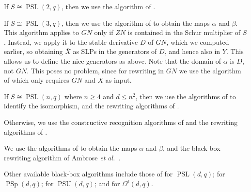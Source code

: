 \documentclass[12pt,twoside,reqno,psamsfonts]{amsproc}
\numberwithin{equation}{section}
\numberwithin{figure}{section}
\newcounter{algorithm}
\theoremstyle{plain}
\theoremstyle{definition}
\theoremstyle{remark}
\DeclareMathOperator{\PSU}{PSU}
\DeclareMathOperator{\PSL}{PSL}
\DeclareMathOperator{\PSp}{PSp}
\begin{document}
\vspace*{0.15cm} 
If $S \cong \PSL(2, q)$, then we use the algorithm of \cite{psl_recognition}. 

If $S \cong \PSL(3, q)$, then we use the algorithm of \cite{MR2356848}
to obtain the maps $\alpha$ and $\beta$. This algorithm applies to
$GN$ only if $ZN$ is contained in the Schur multiplier of
$S$. Instead, we apply it to the stable derivative $D$ of $GN$, which
we computed earlier, so obtaining $\overline{X}$ as SLPs in the
generators of $D$, and hence also in $Y$. This allows us to define the
nice generators as above. Note that the domain of $\alpha$ is 
$D$, not $GN$. This poses no problem, since for rewriting in $GN$ we
use the algorithm of \cite{costi_phd} which only requires $GN$ and
$X$ as input.

If $S \cong \PSL(n, q)$ where $n \geqslant 4$ and $d \leqslant n^2$, then 
we use the algorithms of \cite{small_deg_reps} to identify the isomorphism,
and the rewriting algorithms of \cite{costi_phd}.

Otherwise, 
we use the constructive recognition algorithms of \cite{BDLO}
and the rewriting algorithms of \cite{costi_phd}. 

\vspace*{0.1cm} 
We use the algorithms of \cite{BDLO}
to obtain the maps $\alpha$ and $\beta$, and 
the black-box rewriting algorithm 
of Ambrose {\it et al.}\ \cite{blackrewrite}.

Other available black-box algorithms include those 
of \cite{MR1804385} for $\PSL(d, q)$;
\cite{MR2422320} for $\PSp(d, q)$; 
\cite{Brooksbank03} for $\PSU(d, q)$; 
and \cite{MR2228648} for $\Omega^\epsilon(d, q)$. 

\end{document}

